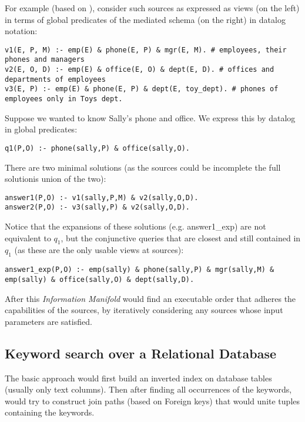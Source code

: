 For example (based on \cite{integr_views2000}), consider such sources as expressed as views (on the left) in terms of global predicates of the mediated schema (on the right) in datalog notation:
%
{\small
\begin{verbatim}
v1(E, P, M) :- emp(E) & phone(E, P) & mgr(E, M). # employees, their phones and managers
v2(E, O, D) :- emp(E) & office(E, O) & dept(E, D). # offices and departments of employees
v3(E, P) :- emp(E) & phone(E, P) & dept(E, toy_dept). # phones of employees only in Toys dept.
\end{verbatim}
}
%
Suppose we wanted to know Sally's phone and office. We express this by datalog in global predicates:
{\small\begin{verbatim}
q1(P,O) :- phone(sally,P) & office(sally,O).
\end{verbatim}}
There are two minimal solutions (as the sources could be incomplete the full solutionis union of the two):
{\small
\begin{verbatim}
answer1(P,O) :- v1(sally,P,M) & v2(sally,O,D).
answer2(P,O) :- v3(sally,P) & v2(sally,O,D).
\end{verbatim}}
Notice that the expansions of these solutions (e.g. answer1\_exp) are not equivalent to $q_1$, but the conjunctive queries that are closest and still contained in $q_1$ (as these are the only usable views at sources):
{\footnotesize\begin{verbatim}
answer1_exp(P,O) :- emp(sally) & phone(sally,P) & mgr(sally,M) & emp(sally) & office(sally,O) & dept(sally,D).
\end{verbatim}
}
After this \textit{Information Manifold} would find an executable order that adheres the capabilities of the sources, by iteratively considering any sources whose input parameters are satisfied. 


\subsection{Keyword search over a Relational Database}

The basic approach would first build an inverted index on database tables (usually only text columns). Then after finding all occurrences of the keywords, would try to construct join paths (based on Foreign keys) that would unite tuples containing the keywords.

